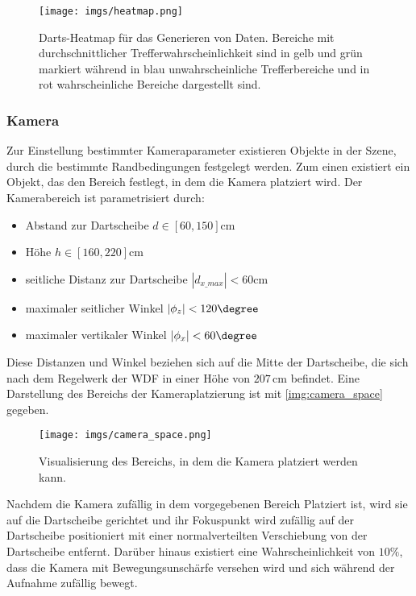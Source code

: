 \begin{figure}
    \centering
    \texttt{[image: imgs/heatmap.png]}
    \caption{Darts-Heatmap für das Generieren von Daten. Bereiche mit durchschnittlicher Trefferwahrscheinlichkeit sind in gelb und grün markiert während in blau unwahrscheinliche Trefferbereiche und in rot wahrscheinliche Bereiche dargestellt sind.}
    \label{img:heatmap}
\end{figure}

\subsubsection{Kamera}
\label{sec:impl:daten:python:kamera}

Zur Einstellung bestimmter Kameraparameter existieren Objekte in der Szene, durch die bestimmte Randbedingungen festgelegt werden. Zum einen existiert ein Objekt, das den Bereich festlegt, in dem die Kamera platziert wird. Der Kamerabereich ist parametrisiert durch:
\begin{itemize}
    \item Abstand zur Dartscheibe $d \in [60, 150]\text{cm}$
    \item Höhe $h \in [160, 220]\text{cm}$
    \item seitliche Distanz zur Dartscheibe $|d_{x\_max}| < 60\text{cm}$
    \item maximaler seitlicher Winkel $|\phi_z| < 120\degree$
    \item maximaler vertikaler Winkel $|\phi_x| < 60\degree$
\end{itemize}

Diese Distanzen und Winkel beziehen sich auf die Mitte der Dartscheibe, die sich nach dem Regelwerk der \ac{WDF} in einer Höhe von $207\,\text{cm}$ befindet. Eine Darstellung des Bereichs der Kameraplatzierung ist mit \autoref{img:camera_space} gegeben.

\begin{figure}
    \centering
    \texttt{[image: imgs/camera\_space.png]}
    \caption{Visualisierung des Bereichs, in dem die Kamera platziert werden kann.}
    \label{img:camera_space}
\end{figure}

Nachdem die Kamera zufällig in dem vorgegebenen Bereich Platziert ist, wird sie auf die Dartscheibe gerichtet und ihr Fokuspunkt wird zufällig auf der Dartscheibe positioniert mit einer normalverteilten Verschiebung von der Dartscheibe entfernt. Darüber hinaus existiert eine Wahrscheinlichkeit von $10\%$, dass die Kamera mit Bewegungsunschärfe versehen wird und sich während der Aufnahme zufällig bewegt.

